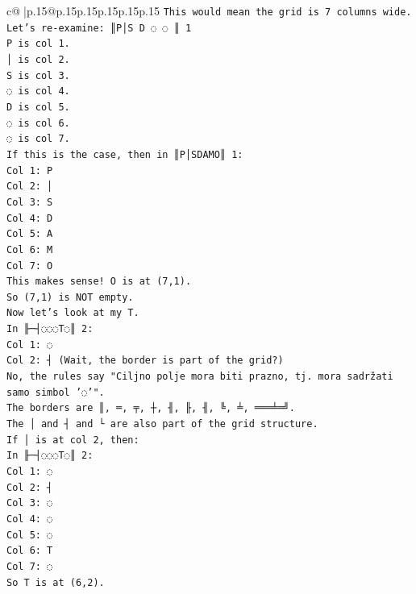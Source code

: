 \documentclass{article}
\begin{document}
{\begin{supertabular}{c@{$\;$}|p{.15\linewidth}@{}p{.15\linewidth}p{.15\linewidth}p{.15\linewidth}p{.15\linewidth}p{.15\linewidth}}
{{{\texttt{This would mean the grid is 7 columns wide.} \\
\texttt{Let's re{-}examine: ║P│S D ◌ ◌ ║ 1} \\
\texttt{P is col 1.} \\
\texttt{│ is col 2.} \\
\texttt{S is col 3.} \\
\texttt{◌ is col 4.} \\
\texttt{D is col 5.} \\
\texttt{◌ is col 6.} \\
\texttt{◌ is col 7.} \\
\texttt{If this is the case, then in ║P│SDAMO║ 1:} \\
\texttt{Col 1: P} \\
\texttt{Col 2: │} \\
\texttt{Col 3: S} \\
\texttt{Col 4: D} \\
\texttt{Col 5: A} \\
\texttt{Col 6: M} \\
\texttt{Col 7: O} \\
\texttt{This makes sense! O is at (7,1).} \\
\texttt{So (7,1) is NOT empty.} \\
\texttt{Now let's look at my T.} \\
\texttt{In ╟─┤◌◌◌T◌║ 2:} \\
\texttt{Col 1: ◌} \\
\texttt{Col 2: ┤ (Wait, the border is part of the grid?)} \\
\texttt{No, the rules say "Ciljno polje mora biti prazno, tj. mora sadržati samo simbol '◌'".} \\
\texttt{The borders are ║, ═, ╤, ┼, ╢, ╟, ╢, ╚, ╧, ═══╧═╝.} \\
\texttt{The │ and ┤ and └ are also part of the grid structure.} \\
\texttt{If │ is at col 2, then:} \\
\texttt{In ╟─┤◌◌◌T◌║ 2:} \\
\texttt{Col 1: ◌} \\
\texttt{Col 2: ┤} \\
\texttt{Col 3: ◌} \\
\texttt{Col 4: ◌} \\
\texttt{Col 5: ◌} \\
\texttt{Col 6: T} \\
\texttt{Col 7: ◌} \\
\texttt{So T is at (6,2).} \\
}}}
\end{supertabular}}
\end{document}
